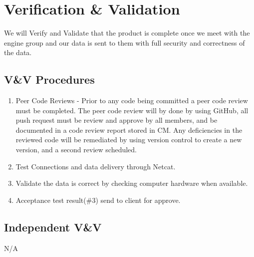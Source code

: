 \documentclass[letterpaper,12pt,oneside,listof=totoc]{scrreprt}
\begin{document}
\chapter{Verification \& Validation}
We will Verify and Validate that the product is complete once we meet with the engine group and our data is sent to them with full security and correctness of the data.

\section{V\&V Procedures}
\begin{enumerate} 
\item Peer Code Reviews - Prior to any code being committed a peer code review must be completed. The peer code review will by done by using GitHub, all push request must be review and approve by all members, and be documented in a code review report stored in CM. Any deficiencies in the reviewed code will be remediated by using version control to create a new version, and a second review scheduled.
\item Test Connections and data delivery through Netcat.
\item Validate the data is correct by checking computer hardware when available.
\item Acceptance test result(\#3) send to client for approve.
\end{enumerate}

\section{Independent V\&V}
N/A
\end{document}
